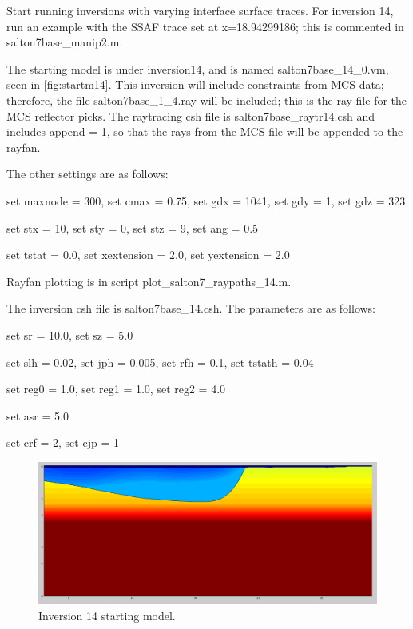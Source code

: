 \documentclass[fontsize=11pt, %
                             paper=a4, %
                             twoside, %
                             captions=tableheading,
                             index=totoc,
                             hyperref]{labbook}
\begin{document}
\begin{addmargin}[4cm]{0cm}




Start running inversions with varying interface surface traces.  For inversion 14, run an example with the SSAF trace set at x=18.94299186; this is commented in salton7base\_manip2.m.  

The starting model is under inversion14, and is named salton7base\_14\_0.vm, seen in \autoref{fig:startm14}.  This inversion will include constraints from MCS data; therefore, the file salton7base\_1\_4.ray will be included; this is the ray file for the MCS reflector picks.  The raytracing csh file is salton7base\_raytr14.csh and includes append = 1, so that the rays from the MCS file will be appended to the rayfan.  

The other settings are as follows:

set maxnode = 300,        
set cmax = 0.75,
set gdx = 1041,
set gdy = 1,
set gdz = 323

set stx = 10,
set sty = 0,
set stz = 9,
set ang = 0.5

set tstat = 0.0,
set xextension = 2.0,
set yextension = 2.0

Rayfan plotting is in script 
plot\_salton7\_raypaths\_14.m.

The inversion csh file is salton7base\_14.csh.  The parameters are as follows:

set sr = 10.0, set sz = 5.0

set slh =  0.02,
set jph =  0.005,
set rfh =  0.1,
set tstath = 0.04

set reg0 =    1.0, set reg1 =    1.0, set reg2 =   4.0

set asr = 5.0

set crf = 2, set cjp = 1

\begin{figure}[h!]
\raggedleft
\includegraphics[scale=0.3,keepaspectratio=true]{figs/inv14_0.png}
\caption{Inversion 14 starting model.}
\label{fig:startm14}
\end{figure}








\end{addmargin}
\end{document}
